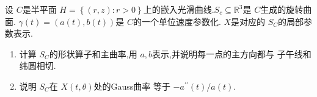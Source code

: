 \documentclass[../../几何与拓扑.tex]{subfiles}
\begin{document}
\begin{problem}
    设 \(  C  \)是半平面 \(  H =  \left\{ \left( r,z \right): r> 0  \right\}  \)上的嵌入光滑曲线.\(  S_{c}\subseteq \mathbb{R} ^{3}  \)是 \(  C  \)生成的旋转曲面. \(   \gamma \left( t \right)= \left( a\left( t \right),b\left( t \right)   \right)    \)是 \(  C  \)的一个单位速度参数化.  \(  X  \)是对应的 \(  S_{C}  \)的局部参数表示.
    \begin{enumerate}
        \item 计算 \(  S_{C}  \)的形状算子和主曲率,用 \(  a,b  \)表示,并说明每一点的主方向都与 子午线和纬圆相切.
        \item 说明 \(  S_{C}  \)在 \(  X\left( t, \theta  \right)   \)处的Gauss曲率 等于 \(  -a^{\prime \prime} \left( t \right) / a\left( t \right)    \).     
    \end{enumerate}
            
\end{problem}
\end{document}
